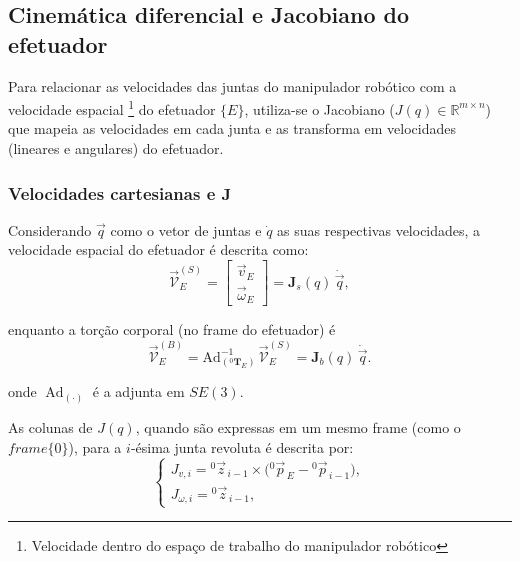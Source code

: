 \subsection{Cinemática diferencial e Jacobiano do efetuador}
Para relacionar as velocidades das juntas do manipulador robótico com a velocidade espacial
\footnote{Velocidade dentro do espaço de trabalho do manipulador robótico}
do efetuador $\{E\}$, utiliza-se o Jacobiano ($J(q)\in\mathbb{R}^{m\times n}$) que mapeia as velocidades em cada junta e as transforma em velocidades (lineares e angulares) do efetuador.

\subsubsection{Velocidades cartesianas e $\mathbf{J}$}
Considerando $\vec q$ como o vetor de juntas e
$\dot{q}$ as suas respectivas velocidades,
a velocidade espacial do efetuador é descrita como:
\begin{equation}
\vec{\mathcal V}_E^{(S)}=
\begin{bmatrix}
    \vec v_E        \\
    \vec \omega_E
\end{bmatrix}
=\mathbf J_s(q)\,\dot{\vec q},
\end{equation}

enquanto a torção corporal (no frame do efetuador) é
\begin{equation}
    \label{eq:veloc_espacial_efetuador}
\vec{\mathcal V}_E^{(B)}=
\mathrm{Ad}_{(^{0}\mathbf T_E)}^{-1}\,\vec{\mathcal V}_E^{(S)}=
\mathbf J_b(q)\,\dot{\vec q}.
\end{equation}

onde $\operatorname{Ad}_{(\cdot)}$ é a adjunta em $SE(3)$.


As colunas de $J(q)$, quando são expressas em um mesmo frame (como o $frame \{0\}$), para a $i$-ésima junta revoluta é descrita por:
\begin{equation}
\label{eq:jac_columns_revoluta}
\begin{cases}
J_{v,i} =
{}^{0}\!\vec{z}_{\,i-1} \times \big({}^{0}\!\vec{p}_{\,E}
- {}^{0}\!\vec{p}_{\,i-1}\big), \\
J_{\omega,i} =
{}^{0}\!\vec{z}_{\,i-1},
\end{cases}
\end{equation}

